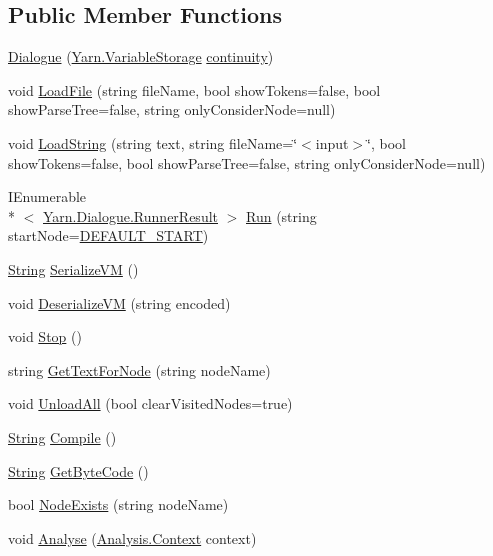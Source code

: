 \subsection*{Public Member Functions}
\begin{DoxyCompactItemize}
\item 
\hyperlink{a00036_a349debf4c4b8d48e3d80ff31ad380b0e}{Dialogue} (\hyperlink{a00088}{Yarn.\-Variable\-Storage} \hyperlink{a00036_ae94eaa4b03b432422f5d205fabe37ff5}{continuity})
\item 
void \hyperlink{a00036_af868f7f6928d122ca1d1857be433d92b}{Load\-File} (string file\-Name, bool show\-Tokens=false, bool show\-Parse\-Tree=false, string only\-Consider\-Node=null)
\item 
void \hyperlink{a00036_a7b66187877ec8a2bfee2298d3dd16706}{Load\-String} (string text, string file\-Name=\char`\"{}$<$input$>$\char`\"{}, bool show\-Tokens=false, bool show\-Parse\-Tree=false, string only\-Consider\-Node=null)
\item 
I\-Enumerable\\*
$<$ \hyperlink{a00069}{Yarn.\-Dialogue.\-Runner\-Result} $>$ \hyperlink{a00036_aead84ee50cb113ca45724894290ce9c2}{Run} (string start\-Node=\hyperlink{a00036_a1b643f15f734090e6a58cbf13dafd28f}{D\-E\-F\-A\-U\-L\-T\-\_\-\-S\-T\-A\-R\-T})
\item 
\hyperlink{a00026_a301aa7c866593a5b625a8fc158bbeacea27118326006d3829667a400ad23d5d98}{String} \hyperlink{a00036_aab20e7ce30fd9c2b3f19f7626be477a4}{Serialize\-V\-M} ()
\item 
void \hyperlink{a00036_aaa680fc471c1d78fd75ed3bde9b491e3}{Deserialize\-V\-M} (string encoded)
\item 
void \hyperlink{a00036_a7a6cabe5612fdcdc4619460431f85112}{Stop} ()
\item 
string \hyperlink{a00036_a594641914a2b59cc5231645273d18e82}{Get\-Text\-For\-Node} (string node\-Name)
\item 
void \hyperlink{a00036_a7acfe32f91b36ee812059f2ad3011133}{Unload\-All} (bool clear\-Visited\-Nodes=true)
\item 
\hyperlink{a00026_a301aa7c866593a5b625a8fc158bbeacea27118326006d3829667a400ad23d5d98}{String} \hyperlink{a00036_a7a8a3a461011172f5624da3a8ffa875f}{Compile} ()
\item 
\hyperlink{a00026_a301aa7c866593a5b625a8fc158bbeacea27118326006d3829667a400ad23d5d98}{String} \hyperlink{a00036_aade6c069db8f01572060d25a963d2a14}{Get\-Byte\-Code} ()
\item 
bool \hyperlink{a00036_a93bb76a1f9a4058f225ff4cee97483c6}{Node\-Exists} (string node\-Name)
\item 
void \hyperlink{a00036_a6b67b239f50c062160666e54592c433f}{Analyse} (\hyperlink{a00031}{Analysis.\-Context} context)
\end{DoxyCompactItemize}
